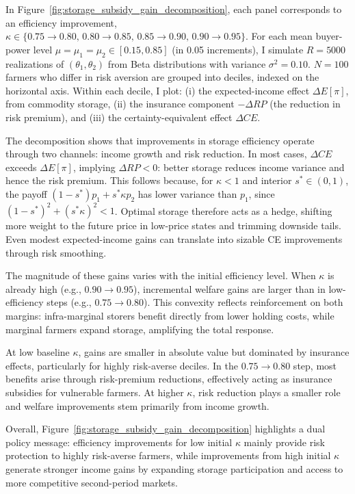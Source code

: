In Figure~\ref{fig:storage_subsidy_gain_decomposition}, each panel corresponds to an efficiency improvement,
$\kappa \in \{0.75\!\to\!0.80,\,0.80\!\to\!0.85,\,0.85\!\to\!0.90,\,0.90\!\to\!0.95\}$. For each mean buyer-power level $\mu=\mu_1=\mu_2 \in [0.15,0.85]$ (in 0.05 increments), I simulate $R=5000$ realizations of $(\theta_1,\theta_2)$ from Beta distributions with variance $\sigma^2=0.10$. $N=100$ farmers who differ in risk aversion are grouped into deciles, indexed on the horizontal axis. Within each decile, I plot: (i) the expected-income effect $\Delta E[\pi]$, from commodity storage, (ii) the insurance component $-\Delta RP$ (the reduction in risk premium), and (iii) the certainty-equivalent effect $\Delta CE$.

The decomposition shows that improvements in storage efficiency operate through two channels: income growth and risk reduction. In most cases, $\Delta CE$ exceeds $\Delta E[\pi]$, implying $\Delta RP<0$: better storage reduces income variance and hence the risk premium. This follows because, for $\kappa<1$ and interior $s^*\in(0,1)$, the payoff $(1-s^*)p_1 + s^*\kappa p_2$ has lower variance than $p_1$, since  
$(1-s^*)^2 + (s^*\kappa)^2 < 1$. Optimal storage therefore acts as a hedge, shifting more weight to the future price in low-price states and trimming downside tails. Even modest expected-income gains can translate into sizable CE improvements through risk smoothing.

The magnitude of these gains varies with the initial efficiency level.  
When $\kappa$ is already high (e.g., $0.90\!\to\!0.95$), incremental welfare gains are larger than in low-efficiency steps (e.g., $0.75\!\to\!0.80$). This convexity reflects reinforcement on both margins: infra-marginal storers benefit directly from lower holding costs, while marginal farmers expand storage, amplifying the total response.

At low baseline $\kappa$, gains are smaller in absolute value but dominated by insurance effects, particularly for highly risk-averse deciles. In the $0.75\!\to\!0.80$ step, most benefits arise through risk-premium reductions, effectively acting as insurance subsidies for vulnerable farmers. At higher $\kappa$, risk reduction plays a smaller role and welfare improvements stem primarily from income growth.

Overall, Figure~\ref{fig:storage_subsidy_gain_decomposition} highlights a dual policy message:  efficiency improvements for low initial $\kappa$ mainly provide risk protection to highly risk-averse farmers, while improvements from high initial $\kappa$ generate stronger income gains by expanding storage participation and access to more competitive second-period markets. 


